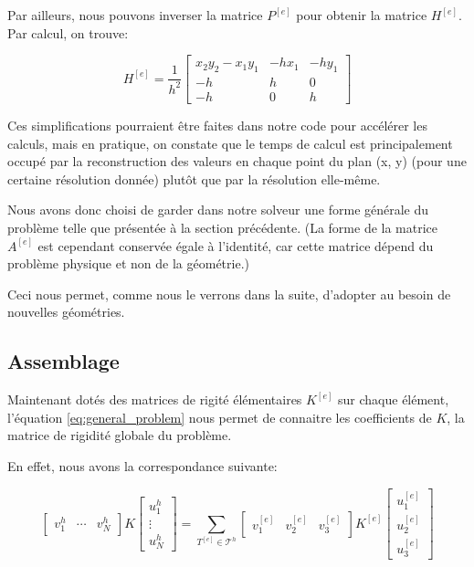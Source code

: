 \documentclass{article}
\begin{document}
Par ailleurs, nous pouvons inverser la matrice $P^{[e]}$ pour obtenir
la matrice $H^{[e]}$. Par calcul, on trouve:

\begin{equation}
    H^{[e]} = \frac{1}{h^2}
    \begin{bmatrix}
        x_2 y_2 - x_1 y_1 & -hx_1 & -hy_1 \\
        -h & h & 0 \\
        -h & 0 & h
    \end{bmatrix}
\end{equation}

Ces simplifications pourraient être faites dans notre code pour
accélérer les calculs, mais en pratique, on constate que le temps de
calcul est principalement occupé par la reconstruction des valeurs
en chaque point du plan (x, y) (pour une certaine résolution donnée)
plutôt que par la résolution elle-même.

Nous avons donc choisi de garder dans notre solveur une forme générale
du problème telle que présentée à la section précédente.
(La forme de la matrice $A^{[e]}$ est cependant conservée égale à l'identité,
car cette matrice dépend du problème physique et non de la géométrie.)

Ceci nous permet, comme nous le verrons dans la suite,
d'adopter au besoin de nouvelles géométries.

\subsection{Assemblage}

Maintenant dotés des matrices de rigité élémentaires $K^{[e]}$
sur chaque élément, l'équation \ref{eq:general_problem} nous permet
de connaitre les coefficients de $K$, la matrice de rigidité globale
du problème.

En effet, nous avons la correspondance suivante:

\begin{equation}
    \begin{bmatrix}
        v^h_1 & \cdots & v^h_N
    \end{bmatrix}
    K
    \begin{bmatrix}
        u^h_1 \\ \vdots \\ u^h_N
    \end{bmatrix}
    = \sum_{T^{[e]} \in \mathcal{T}^h}
    \begin{bmatrix}
        v^{[e]}_1 & v^{[e]}_2 & v^{[e]}_3
    \end{bmatrix}
    K^{[e]}
    \begin{bmatrix}
        u^{[e]}_1 \\ u^{[e]}_2 \\ u^{[e]}_3
    \end{bmatrix}
    \label{eq:assemblage}
\end{equation}
\end{document}
